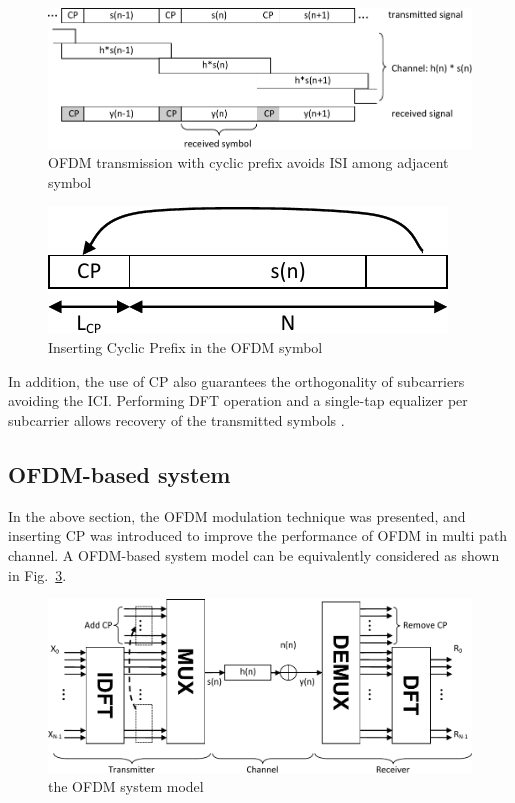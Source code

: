 \begin{figure}
	\centerline{\includegraphics [width=0.8\columnwidth] {Figures/CIR_CP.pdf} }
	\caption{OFDM transmission with cyclic prefix avoids ISI among adjacent symbol}
	\label{fig:CIR-CP}
\end{figure}

\begin{figure}
	\centerline{\includegraphics [width=0.8\columnwidth] {Figures/CP.pdf} }
	\caption{Inserting Cyclic Prefix in the OFDM symbol}
	\label{fig:CP}
\end{figure}

In addition, the use of CP also guarantees the orthogonality of subcarriers avoiding the ICI. Performing DFT operation and a single-tap equalizer per subcarrier allows recovery of the transmitted symbols \cite{farhang2008signal}. 

\subsection{OFDM-based system}
In the above section, the OFDM modulation technique was presented, and inserting CP was introduced to improve the performance of OFDM in multi path channel. 
A OFDM-based system model can be equivalently considered as shown in Fig.~\ref{fig:OFDM-model}.

\begin{figure}
	\centerline{\includegraphics [width=0.8\columnwidth] {Figures/OFDM-model.pdf} }
	\caption{the OFDM system model}
	\label{fig:OFDM-model}
\end{figure}

